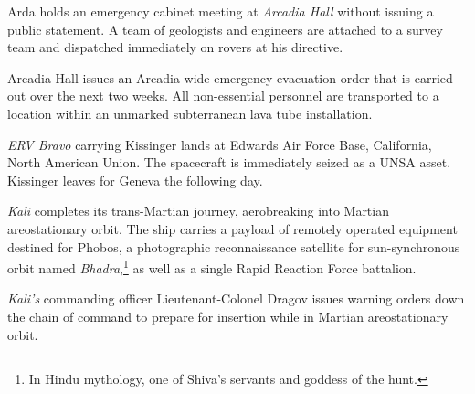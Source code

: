 Arda holds an emergency cabinet meeting at {\it Arcadia Hall} without issuing a public statement. A team of geologists and engineers are attached to a survey team and dispatched immediately on rovers at his directive.
\StopTimelineDate

Arcadia Hall issues an Arcadia-wide emergency evacuation order that is carried out over the next two weeks. All non-essential personnel are transported to a location within an unmarked subterranean lava tube installation.
\StopTimelineDate

{\it ERV Bravo} carrying Kissinger lands at Edwards Air Force Base, California, North American Union. The spacecraft is immediately seized as a UNSA asset. Kissinger leaves for Geneva the following day.
\StopTimelineDate

{\it Kali} completes its trans-Martian journey, aerobreaking into Martian areostationary orbit. The ship carries a payload of remotely operated equipment destined for Phobos, a photographic reconnaissance satellite for sun-synchronous orbit named {\it Bhadra},\footnote{In Hindu mythology, one of Shiva's servants and goddess of the hunt.} as well as a single Rapid Reaction Force battalion.
\StopTimelineDate

{\it Kali's} commanding officer Lieutenant-Colonel Dragov issues warning orders down the chain of command to prepare for insertion while in Martian areostationary orbit.
\StopTimelineDate

